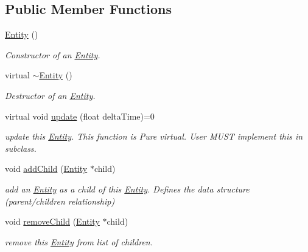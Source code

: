 \subsection*{Public Member Functions}
\begin{DoxyCompactItemize}
\item 
\mbox{\label{class_entity_a980f368aa07ce358583982821533a54a}} 
\hyperlink{class_entity_a980f368aa07ce358583982821533a54a}{Entity} ()
\begin{DoxyCompactList}\small\item\em Constructor of an \hyperlink{class_entity}{Entity}. \end{DoxyCompactList}\item 
\mbox{\label{class_entity_adf6d3f7cb1b2ba029b6b048a395cc8ae}} 
virtual \hyperlink{class_entity_adf6d3f7cb1b2ba029b6b048a395cc8ae}{$\sim$\+Entity} ()
\begin{DoxyCompactList}\small\item\em Destructor of an \hyperlink{class_entity}{Entity}. \end{DoxyCompactList}\item 
virtual void \hyperlink{class_entity_a7082aeb577c91707cc28edce571320f7}{update} (float delta\+Time)=0
\begin{DoxyCompactList}\small\item\em update this \hyperlink{class_entity}{Entity}. This function is Pure virtual. User M\+U\+ST implement this in subclass. \end{DoxyCompactList}\item 
void \hyperlink{class_entity_a445e5c82020eae36a145a692ff8482bc}{add\+Child} (\hyperlink{class_entity}{Entity} $\ast$child)
\begin{DoxyCompactList}\small\item\em add an \hyperlink{class_entity}{Entity} as a child of this \hyperlink{class_entity}{Entity}. Defines the data structure (parent/children relationship) \end{DoxyCompactList}\item 
void \hyperlink{class_entity_a45d5a3b92478ad8b4fb305b9b3e08c7a}{remove\+Child} (\hyperlink{class_entity}{Entity} $\ast$child)
\begin{DoxyCompactList}\small\item\em remove this \hyperlink{class_entity}{Entity} from list of children. \end{DoxyCompactList}\item 

\end{DoxyCompactItemize}
